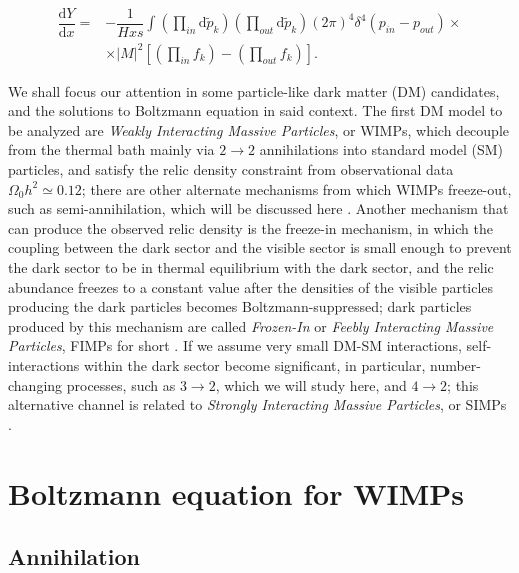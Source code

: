 \documentclass[final,5p,times,twocolumn, nopreprintline]{elsarticle}
\numberwithin{equation}{section}
\begin{document}
\begin{align}
\dfrac{\mathrm{d}Y}{\mathrm{d}x}=&-\dfrac{1}{Hxs}\int\left(\prod_{in}\mathrm{d}\tilde{p}_k\right)\left(\prod_{out}\mathrm{d}\tilde{p}_k\right)(2\pi)^4\delta^4(p_{in}-p_{out})\times\nonumber\\&\times|M|^2\left[\left(\prod_{in}f_k\right)-\left(\prod_{out}f_k\right)\right]. \label{eq:collision_sim}
\end{align}

We shall focus our attention in some particle-like dark matter (DM) candidates, and the solutions to Boltzmann equation in said context. The first DM model to be analyzed are \emph{Weakly Interacting Massive Particles}, or WIMPs, which decouple from the thermal bath mainly via $2\rightarrow2$ annihilations into standard model (SM) particles, and satisfy the relic density constraint from observational data $\Omega_0 h^2\simeq0.12$; there are other alternate mechanisms from which WIMPs freeze-out, such as semi-annihilation, which will be discussed here \cite{bhattacharya2020simpler}. Another mechanism that can produce the observed relic density is the freeze-in mechanism, in which the coupling between the dark sector and the visible sector is small enough to prevent the dark sector to be in thermal equilibrium with the dark sector, and the relic abundance freezes to a constant value after the densities of the visible particles producing the dark particles becomes Boltzmann-suppressed; dark particles produced by this mechanism are called \emph{Frozen-In} or \emph{Feebly Interacting Massive Particles}, FIMPs for short \cite{bernal2017dawn}. If we assume very small DM-SM interactions, self-interactions within the dark sector become significant, in particular, number-changing processes, such as $3\to2$, which we will study here, and $4\to2$; this alternative channel is related to \emph{Strongly Interacting Massive Particles}, or SIMPs \cite{bhattacharya2020simpler}.

\section{Boltzmann equation for WIMPs}

\subsection{Annihilation}
\end{document}
